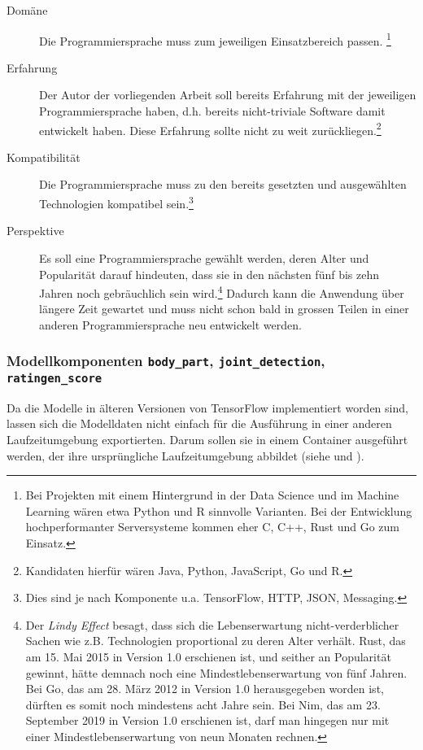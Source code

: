 \begin{description}
    \item[Domäne] Die Programmiersprache muss zum jeweiligen Einsatzbereich passen. \footnote{Bei Projekten mit einem Hintergrund in der Data Science und im Machine Learning wären etwa Python und R sinnvolle Varianten. Bei der Entwicklung hochperformanter Serversysteme kommen eher C, C++, Rust und Go zum Einsatz.}
    \item[Erfahrung] Der Autor der vorliegenden Arbeit soll bereits Erfahrung mit der jeweiligen Programmiersprache haben, d.h. bereits nicht-triviale Software damit entwickelt haben. Diese Erfahrung sollte nicht zu weit zurückliegen.\footnote{Kandidaten hierfür wären Java, Python, JavaScript, Go und R.}
    \item[Kompatibilität] Die Programmiersprache muss zu den bereits gesetzten und ausgewählten Technologien kompatibel sein.\footnote{Dies sind je nach Komponente u.a. TensorFlow, HTTP, JSON, Messaging.}
    \item[Perspektive] Es soll eine Programmiersprache gewählt werden, deren Alter und Popularität darauf hindeuten, dass sie in den nächsten fünf bis zehn Jahren noch gebräuchlich sein wird.\footnote{Der \textit{Lindy Effect} \cite{goldman1964} besagt, dass sich die Lebenserwartung nicht-verderblicher Sachen wie z.B. Technologien proportional zu deren Alter verhält. Rust, das am 15. Mai 2015 in Version 1.0 erschienen ist, und seither an Popularität gewinnt, hätte demnach noch eine Mindestlebenserwartung von fünf Jahren. Bei Go, das am 28. März 2012 in Version 1.0 herausgegeben worden ist, dürften es somit noch mindestens acht Jahre sein. Bei Nim, das am 23. September 2019 in Version 1.0 erschienen ist, darf man hingegen nur mit einer Mindestlebenserwartung von neun Monaten rechnen.} Dadurch kann die Anwendung über längere Zeit gewartet und muss nicht schon bald in grossen Teilen in einer anderen Programmiersprache neu entwickelt werden.
\end{description}

\subsubsection{Modellkomponenten \texttt{body\_part}, \texttt{joint\_detection}, \texttt{ratingen\_score}}
\label{sec:wahl-der-programmiersprache-modellkomponenten}

Da die Modelle in älteren Versionen von TensorFlow implementiert worden sind, lassen sich die Modelldaten nicht einfach für die Ausführung in einer anderen Laufzeitumgebung exportierten. Darum sollen sie in einem Container ausgeführt werden, der ihre ursprüngliche Laufzeitumgebung abbildet (siehe  und ).

